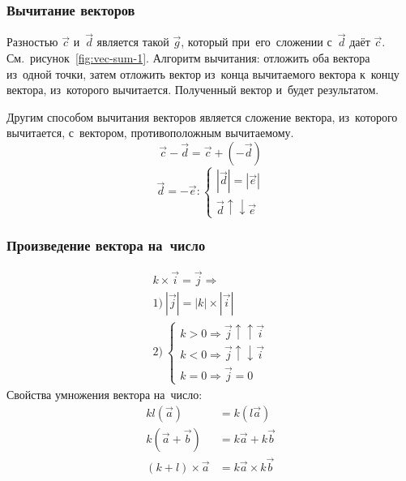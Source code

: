 \documentclass[]{scrartcl}
\begin{document}
\subsubsection{Вычитание векторов} 
Разностью ${\textstyle \vec{c}}$ и~${\textstyle \vec{d}}$ является такой ${\textstyle \vec{g}}$, который при~его~сложении с~${\textstyle \vec{d}}$ даёт ${\textstyle \vec{c}}$. См.~рисунок~\ref{fig:vec-sum-1}. Алгоритм вычитания: отложить оба вектора из~одной точки, затем отложить вектор из~конца вычитаемого вектора к~концу вектора, из~которого вычитается. Полученный вектор и~будет результатом.

Другим способом вычитания векторов является сложение вектора, из~которого вычитается, с~вектором, противоположным вычитаемому.
\begin{equation}\label{eq:vec-subtraction-1}
\vec{c}-\vec{d} = \vec{c} + (-\vec{d})
\end{equation}
\begin{equation}\label{eq:vec-subtraction-2}
\vec{d} = -\vec{e}:
\begin{cases}
|\vec{d}|=|\vec{e}|\\
\vec{d}\uparrow \downarrow \vec{e}
\end{cases}
\end{equation}

\subsubsection{Произведение вектора на~число}
\begin{equation}\label{eq:vec-mult-number}
\begin{aligned}
k\times \vec{i}=\vec{j} \Rightarrow\\
1)\ |\vec{j}|=|k|\times|\vec{i}|\\
2)\ 
\begin{cases}
k>0 \Rightarrow \vec{j}\uparrow \uparrow \vec{i}\\
k<0 \Rightarrow \vec{j}\uparrow \downarrow \vec{i}\\
k=0 \Rightarrow \vec{j}=0
\end{cases}
\end{aligned}
\end{equation}
Свойства умножения вектора на~число:
\begin{equation}\label{eq:vec-mult-number-prop}
\begin{aligned}
kl(\vec{a})&=k(l\vec{a})\\
k(\vec{a}+\vec{b})&=k\vec{a}+k\vec{b}\\
(k+l)\times \vec{a}&=k\vec{a}\times k\vec{b}
\end{aligned}
\end{equation}
\end{document}
